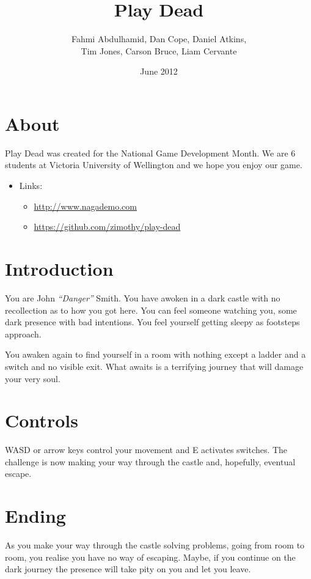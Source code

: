 \documentclass{article}
\begin{document}
 \title{Play Dead}
 \author{Fahmi Abdulhamid, Dan Cope, Daniel Atkins,\\Tim Jones, Carson Bruce, Liam Cervante}
 \date{June 2012}
 \maketitle
 
 \section{About}Play Dead was created for the National Game Development Month. We are 6 students at Victoria University of Wellington and we hope you enjoy our game.
 \begin{itemize}
  \item Links:
  \begin{itemize}
   \item \url{http://www.nagademo.com}
   \item \url{https://github.com/zimothy/play-dead}
  \end{itemize}
 \end{itemize}
 
 \section{Introduction}
 
 You are John \emph{``Danger''} Smith. You have awoken in a dark castle with no recollection as to how you got here. You can feel someone watching you, some dark presence with bad intentions. You feel yourself getting sleepy as footsteps approach.
 
 You awaken again to find yourself in a room with nothing except a ladder and a switch and no visible exit. What awaits is a terrifying journey that will damage your very soul.
 
 \section{Controls}
 
 WASD or arrow keys control your movement and E activates switches. The challenge is now making your way through the castle and, hopefully, eventual escape.
 
 \section{Ending}
 
 As you make your way through the castle solving problems, going from room to room, you realise you have no way of escaping. Maybe, if you continue on the dark journey the presence will take pity on you and let you leave.
 
\end{document}
